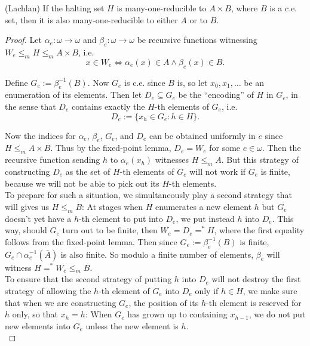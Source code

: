 \begin{theorem}
  (Lachlan) If the halting set $H$ is many-one-reducible to $A\times B$,
  where $B$ is a c.e. set, then it is also many-one-reducible to either $A$
  or to $B$.
\end{theorem}
\begin{proof}
  Let $\alpha_e:\omega \rightarrow\omega$ and $\beta_e:\omega
  \rightarrow\omega$ be recursive functions witnessing $W_e\leq_m H\leq_m
  A\times B$, i.e.
  \[x\in W_e \Leftrightarrow \alpha_e(x)\in A \wedge \beta_e(x)\in B.\]

  Define $G_e:=\beta_e^{-1}(B)$. Now $G_e$ is c.e. since $B$ is, so let
  $x_0,x_1,\ldots$ be an enumeration of its elements. Then let
  $D_e\subseteq G_e$ be the ``encoding'' of $H$ in $G_e$, in the sense that
  $D_e$ contains exactly the $H$-th elements of $G_e$, i.e.
  \[D_e :=\{x_h\in G_e: h\in H\}.\]

  Now the indices for $\alpha_e$, $\beta_e$, $G_e$, and $D_e$ can be
  obtained uniformly in $e$ since $H\leq_m A\times B$. Thus by the
  fixed-point lemma, $D_e=W_e$ for some $e\in\omega$. Then the recursive
  function sending $h$ to $\alpha_e(x_h)$ witnesses $H\leq_m A$. But this
  strategy of constructing $D_e$ as the set of $H$-th elements of $G_e$
  will not work if $G_e$ is finite, because we will not be able to pick out
  its $H$-th elements.\\

  To prepare for such a situation, we simultaneously play a second strategy
  that will gives us $H\leq_m B$: At stages when $H$ enumerates a new
  element $h$ but $G_e$ doesn't yet have a $h$-th element to put into
  $D_e$, we put instead $h$ into $D_e$. This way, should $G_e$ turn out to
  be finite, then $W_e=D_e=^*H$, where the first equality follows from the
  fixed-point lemma. Then since $G_e:=\beta_e^{-1}(B)$ is finite,
  $G_e\cap \alpha_e^{-1}(\bar{A})$ is also finite. So modulo a finite
  number of elements, $\beta_e$ will witness $H=^*W_e\leq_m B$.\\

  To ensure that the second strategy of putting $h$ into $D_e$ will not
  destroy the first strategy of allowing the $h$-th element of $G_e$ into
  $D_e$ only if $h\in H$, we make sure that when we are constructing $G_e$,
  the position of its $h$-th element is reserved for $h$ only, so that
  $x_h=h$: When $G_e$ has grown up to containing $x_{h-1}$, we do not put
  new elements into $G_e$ unless the new element is $h$.\\


\end{proof}
